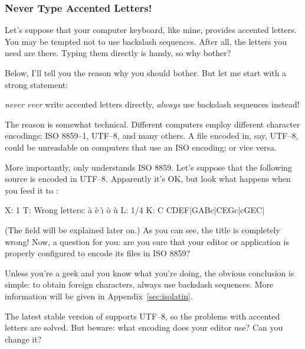 \documentclass[a4paper,fullpage,12pt]{book}
\begin{document}

\subsubsection{Never Type Accented Letters!}

Let's suppose that your computer keyboard, like mine, provides
accented letters. You may be tempted not to use backslash sequences.
After all, the letters you need are there. Typing them directly is
handy, so why bother?

Below, I'll tell you the reason why you should bother. But let me
start with a strong statement:

\begin{vimp}
  
  \emph{never ever} write accented letters directly, \emph{always} use
  backslash sequences instead!
  
\end{vimp}

The reason is somewhat technical. Different computers employ different
character encodings: ISO 8859--1, UTF--8, and many others. A
 file encoded in, say, UTF--8, could be unreadable on
computers that use an ISO encoding; or vice versa.

More importantly, \abcm{} only understands ISO 8859. Let's suppose
that the following source is encoded in UTF--8. Apparently it's OK,
but look what happens when you feed it to \abcm:

\begin{abcsource}
X: 1
T: Wrong letters: \`a \`e \`\i{} \`o \`u
L: 1/4
K: C
CDEF|GABc|CEGc|cGEC|
\end{abcsource}


(The  field will be explained later on.) As you can see, the
title is completely wrong! Now, a question for you: are you sure that
your editor or \ABC{} application is properly configured to encode its
files in ISO 8859?

Unless you're a geek and you know what you're doing, the obvious
conclusion is simple: to obtain foreign characters, always use
backslash sequences. More information will be given in
Appendix~\ref{sec:isolatin}.

\begin{note}
  
  The latest stable version of \abcm{} supports UTF--8, so the 
  problems with accented letters are solved. But beware: what encoding
  does your editor use? Can you change it?
  
\end{note}
\end{document}
